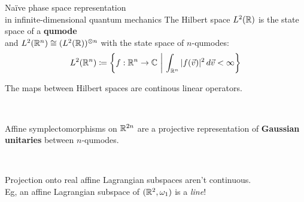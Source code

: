 \documentclass{beamer}
\newcommand{\vcenteredinclude}[1]{\begingroup
\setbox0=\hbox{\texttt{[image: \#1]}}%
\parbox{\wd0}{\box0}\endgroup}
\begin{document}
\begin{frame}{Na\"ive phase space representation\\in infinite-dimensional quantum mechanics}
  The Hilbert space \(L^2(\mathbb{R})\) is the state space of a \textbf{qumode}\\
  and \(L^2(\mathbb{R}^n)\cong (L^2(\mathbb{R}))^{\otimes n}\) with the state space of \(n\)-qumodes:
\[
    L^2(\R^n)\coloneqq \left\{ f:\R^n\to \C  \ \middle| \ \int_{\R^n} | f(\vec v) |^2\, d\vec v <\infty \right\}
\]

The maps between Hilbert spaces are continous linear operators.

\

Affine symplectomorphisms on \(\mathbb{R}^{2n}\) are a projective representation of \textbf{Gaussian unitaries} between \(n\)-qumodes.

\

Projection onto real affine Lagrangian subspaces aren't continuous. \\

Eg, an affine Lagrangian subspace of \((\mathbb{R}^{2},\omega_1)\) is a \emph{line}!
\end{frame}


\end{document}
